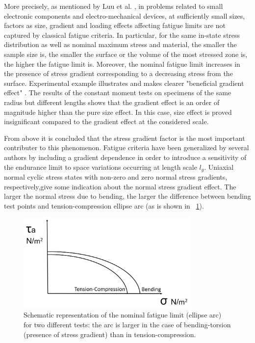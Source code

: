 \documentclass[3p,times,procedia,number]{elsarticle}
\newcommand{\figref}[1]{\figurename~\ref{#1}}
\begin{document}
More precisely, as mentioned by Luu et al. \cite{luu2013formulation}, in problems related to small electronic components and electro-mechanical devices, at sufficiently small sizes, factors as size, gradient and loading effects affecting fatigue limits are not captured by classical fatigue criteria. In particular,  for the same in-state stress distribution as well as nominal maximum stress and material, the smaller the sample size is, the smaller the surface or the volume of the most stressed zone is, the higher the fatigue limit is.  Moreover, the nominal fatigue limit increases in the presence of stress gradient corresponding to a decreasing stress from the surface. Experimental example illustrates and makes clearer "beneficial gradient effect" \cite{Papadopoulos1996513}. The results of the constant moment tests on specimens of the same radius but different lengths shows that the gradient effect is an order of magnitude higher than the pure size effect. In this case, size effect is proved insignificant compared to the gradient effect at the considered scale.

From above it is concluded that the stress gradient factor is the most important contributer to this phenomenon. Fatigue criteria have been  generalized by several authors by including a  gradient dependence \cite{Papadopoulos1996513} in order to  introduce a sensitivity of the endurance limit to space variations occurring at length scale  $l_g$. Uniaxial normal cyclic stress states with non-zero and zero normal stress gradients, respectively,give some indication about the normal stress gradient effect. The larger the normal stress due to bending, the larger the difference between bending test points and tension-compression ellipse arc (as is shown in \figref{fig2}).
\begin{figure}[!h]
	\centering
	\includegraphics[width=0.8\textwidth]{figures//fig2.jpg} 
	\caption{Schematic representation of the nominal fatigue limit (ellipse arc) for two different tests: the arc is larger in the case of bending-torsion (presence of stress gradient) than in tension-compression.}
	\label{fig2}
\end{figure}
\end{document}
